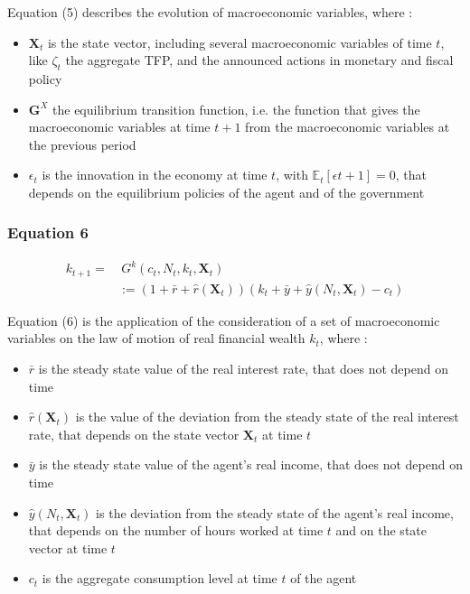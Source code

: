 \documentclass{article}
\begin{document}
Equation (5) describes the evolution of macroeconomic variables, where : 
\begin{itemize}
    \item $\bm{X}_t$ is the state vector, including several macroeconomic variables of time $t$, like $\zeta_t$ the aggregate TFP, and the announced actions in monetary and fiscal policy
    \item $\bm{G}^X$ the equilibrium transition function, i.e. the function that gives the macroeconomic variables at time $t+1$ from the macroeconomic variables at the previous period
    \item $\epsilon_{t}$ is the innovation in the economy at time $t$, with $\mathbb{E}_{t}\left[\epsilon{t+1}\right]=0$, that depends on the equilibrium policies of the agent and of the government
\end{itemize}

\subsubsection*{Equation 6}

\begin{equation}\tag{6}
    \begin{split}
        k_{t+1}= &\ G^{k}(c_{t},N_{t}, k_{t}, \bm{X}_{t}) \\ 
        & := (1+\bar{r}+\hat{r}(\bm{X}_{t}))(k_{t}+\bar{y}+\hat{y}(N_{t},\bm{X}_{t})-c_{t})
    \end{split}
\end{equation}

Equation (6) is the application of the consideration of a set of macroeconomic variables on the law of motion of real financial wealth $k_{t}$, where : 
\begin{itemize}
    \item $\bar{r}$ is the steady state value of the real interest rate, that does not depend on time
    \item $\hat{r}(\bm{X}_{t})$ is the value of the deviation from the steady state of the real interest rate, that depends on the state vector $\bm{X}_{t}$ at time $t$
    \item $\bar{y}$ is the steady state value of the agent's real income, that does not depend on time
    \item $\hat{y}(N_{t},\bm{X}_{t})$ is the deviation from the steady state of the agent's real income, that depends on the number of hours worked at time $t$ and on the state vector at time $t$
    \item $c_{t}$ is the aggregate consumption level at time $t$ of the agent
\end{itemize}
\end{document}
